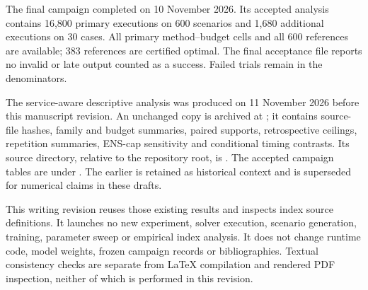 The final campaign completed on 10 November 2026. Its accepted analysis
contains 16,800 primary executions on 600 scenarios and 1,680 additional
executions on 30 cases. All primary method--budget cells and all 600 references
are available; 383 references are certified optimal. The final acceptance
file reports no invalid or late output counted as a success. Failed trials
remain in the denominators.

The service-aware descriptive analysis was produced on 11 November 2026
before this manuscript revision. An unchanged copy is archived at
; it contains source-file hashes,
family and budget summaries, paired supports, retrospective ceilings,
repetition summaries, ENS-cap sensitivity and conditional timing contrasts.
Its source directory, relative to the repository root, is
.
The accepted campaign tables are under
.
The earlier  is retained as
historical context and is superseded for numerical claims in these drafts.

This writing revision reuses those existing results and inspects index source
definitions. It launches no new experiment, solver execution, scenario
generation, training, parameter sweep or empirical index analysis. It does not
change runtime code, model weights, frozen campaign records or bibliographies.
Textual consistency checks are separate from \LaTeX{} compilation and rendered
PDF inspection, neither of which is performed in this revision.
